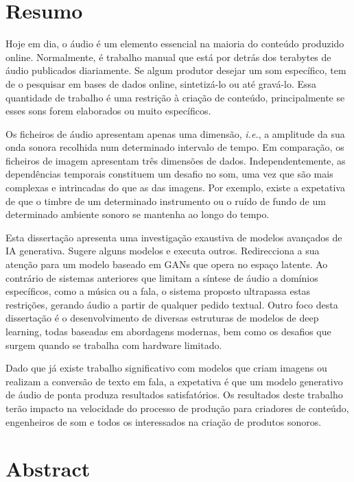 \chapter*{Resumo}

Hoje em dia, o áudio é um elemento essencial na maioria do conteúdo produzido online. Normalmente, é trabalho manual que está por detrás dos terabytes de áudio publicados diariamente. Se algum produtor desejar um som específico, tem de o pesquisar em bases de dados online, sintetizá-lo ou até gravá-lo. Essa quantidade de trabalho é uma restrição à criação de conteúdo, principalmente se esses sons forem elaborados ou muito específicos.

Os ficheiros de áudio apresentam apenas uma dimensão, \textit{i.e.}, a amplitude da sua onda sonora recolhida num determinado intervalo de tempo. Em comparação, os ficheiros de imagem apresentam três dimensões de dados. Independentemente, as dependências temporais constituem um desafio no som, uma vez que são mais complexas e intrincadas do que as das imagens. Por exemplo, existe a expetativa de que o timbre de um determinado instrumento ou o ruído de fundo de um determinado ambiente sonoro se mantenha ao longo do tempo.

Esta dissertação apresenta uma investigação exaustiva de modelos avançados de IA generativa. Sugere alguns modelos e executa outros. Redirecciona a sua atenção para um modelo baseado em GANs que opera no espaço latente. Ao contrário de sistemas anteriores que limitam a síntese de áudio a domínios específicos, como a música ou a fala, o sistema proposto ultrapassa estas restrições, gerando áudio a partir de qualquer pedido textual. Outro foco desta dissertação é o desenvolvimento de diversas estruturas de modelos de deep learning, todas baseadas em abordagens modernas, bem como os desafios que surgem quando se trabalha com hardware limitado.

Dado que já existe trabalho significativo com modelos que criam imagens ou realizam a conversão de texto em fala, a expetativa é que um modelo generativo de áudio de ponta produza resultados satisfatórios. Os resultados deste trabalho terão impacto na velocidade do processo de produção para criadores de conteúdo, engenheiros de som e todos os interessados na criação de produtos sonoros.

\chapter*{Abstract}

